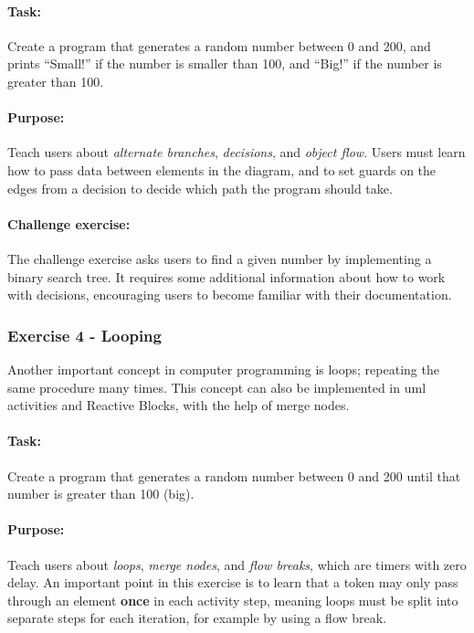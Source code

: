 \paragraph{Task:} Create a program that generates a random number between 0 and 200, and prints ``Small!'' if the number is smaller than 100, and ``Big!'' if the number is greater than 100.

\paragraph{Purpose:} Teach users about \emph{alternate branches}, \emph{decisions}, and \emph{object flow}. Users must learn how to pass data between elements in the diagram, and to set guards on the edges from a decision to decide which path the program should take.

\paragraph{Challenge exercise:} The challenge exercise asks users to find a given number by implementing a binary search tree. It requires some additional information about how to work with decisions, encouraging users to become familiar with their documentation.

\subsubsection{Exercise 4 - Looping}
Another important concept in computer programming is loops; repeating the same procedure many times. This concept can also be implemented in \gls{uml} activities and Reactive Blocks, with the help of merge nodes.

\paragraph{Task:} Create a program that generates a random number between 0 and 200 until that number is greater than 100 (big).

\paragraph{Purpose:} Teach users about \emph{loops}, \emph{merge nodes}, and \emph{flow breaks}, which are timers with zero delay. An important point in this exercise is to learn that a token may only pass through an element \textbf{once} in each activity step, meaning loops must be split into separate steps for each iteration, for example by using a flow break.

